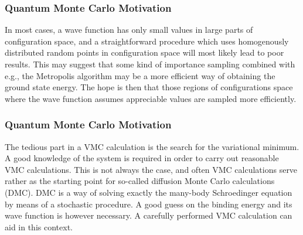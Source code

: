 \documentclass{beamer}
\begin{document}
\begin{frame}
\frametitle{Quantum Monte Carlo Motivation}

\begin{block}{}
In most cases, a wave function has only small values in large parts of 
configuration space, and a straightforward procedure which uses
homogenously distributed random points in configuration space 
will most likely lead to poor results. This may suggest that some kind
of importance sampling combined with e.g., the Metropolis algorithm 
may be  a more efficient way of obtaining the ground state energy.
The hope is then that those regions of configurations space where
the wave function assumes appreciable values are sampled more 
efficiently. 
\end{block}
\end{frame}

\begin{frame}
\frametitle{Quantum Monte Carlo Motivation}

\begin{block}{}
The tedious part in a VMC calculation is the search for the variational
minimum. A good knowledge of the system is required in order to carry out
reasonable VMC calculations. This is not always the case, 
and often VMC calculations 
serve rather as the starting
point for so-called diffusion Monte Carlo calculations (DMC). DMC is a way of
solving exactly the many-body Schroedinger equation by means of 
a stochastic procedure. A good guess on the binding energy
and its wave function is however necessary. 
A carefully performed VMC calculation can aid in this context. 
\end{block}
\end{frame}
\end{document}
